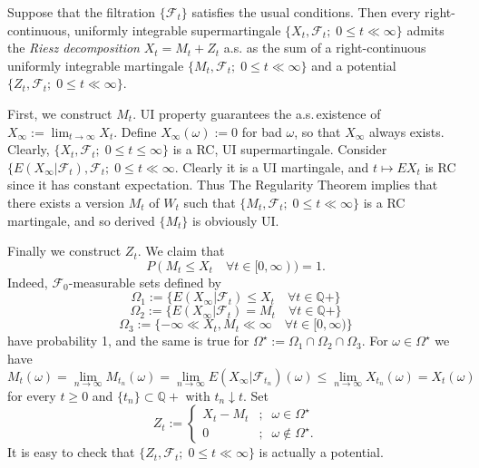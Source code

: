\documentclass{report}
\begin{document}
\setcounter{exe}{17}
\begin{exe}
	Suppose that the filtration \( \{\mathscr{F}_t\} \) satisfies the usual conditions.
	Then every right-continuous, uniformly integrable supermartingale \( \{X_t, \mathscr{F}_t;\; 0\le t\ll \infty \} \) admits the \textit{Riesz decomposition} \( X_t=M_t+Z_t \) a.s.
	as the sum of a right-continuous uniformly integrable martingale \( \{M_t, \mathscr{F}_t;\; 0\le t\ll \infty \} \) and a potential \( \{Z_t, \mathscr{F}_t;\; 0\le t\ll \infty \} \).
\end{exe}
\begin{prf}
	First, we construct \( M_t \).
	UI property guarantees the a.s.\,existence of \( X_{\infty }:=\lim_{t\to \infty }X_t \).
	Define \( X_{\infty }(\omega):=0 \) for bad \( \omega \), so that \( X_{\infty } \) always exists.
	Clearly, \( \{X_t, \mathscr{F}_t;\; 0\le t\le \infty \} \) is a RC, UI supermartingale.
	Consider \( \{E(X_{\infty }|\mathscr{F}_t), \mathscr{F}_t;\; 0\le t\ll \infty  \).
	Clearly it is a UI martingale, and \( t\mapsto EX_t \) is RC since it has constant expectation.
	Thus The Regularity Theorem implies that there exists a version \( M_t \) of \( W_t \)
	such that \( \{M_t,\mathscr{F}_t;\;0\le t\ll \infty \} \) is a RC martingale, and 
	so derived \( \{M_t\} \) is obviously UI.
	
	Finally we construct \( Z_t \). We claim that
	\[
		P(M_t\le X_t \quad \forall t\in[0,\infty ) )=1.
	\]
	Indeed, \( \mathscr{F}_0 \)-measurable sets defined by
	\[
		\Omega_1:=\{E(X_{\infty }|\mathscr{F}_t)\le X_t\quad \forall t\in \mathbb{Q}+\}
	\]
	\[
		\Omega_2:=\{E(X_{\infty }|\mathscr{F}_t)=M_t \quad \forall t\in \mathbb{Q}+\}
	\]
	\[
		\Omega_3:=\{-\infty \ll X_t, M_t\ll \infty \quad \forall t\in[0,\infty)\}
	\]
	have probability 1, and the same is true for \( \Omega^{\star}:=\Omega_1\cap \Omega_2 \cap \Omega_3 \).
	For \( \omega \in \Omega^{\star} \) we have
	\[M_t(\omega)=\lim_{n\to \infty }M_{t_n}(\omega)= \lim_{n\to \infty }E(X_{\infty }|\mathscr{F}_{t_n})(\omega)\le \lim_{n\to \infty }X_{t_n}(\omega)=X_t(\omega)\]
	for every \( t\ge0 \) and \( \{t_n\}\subset \mathbb{Q}+ \) with \( t_n\downarrow t \).
	Set
	\begin{equation*}
		Z_t:=\begin{cases}
			X_t-M_t & ;\;\;\omega \in \Omega^{\star}     \\
			0       & ;\;\;\omega \notin \Omega^{\star}.
		\end{cases}
	\end{equation*}
	It is easy to check that \( \{Z_t,\mathscr{F}_t;\;0\le t\ll \infty \} \) is actually a potential.
\end{prf}
\end{document}
